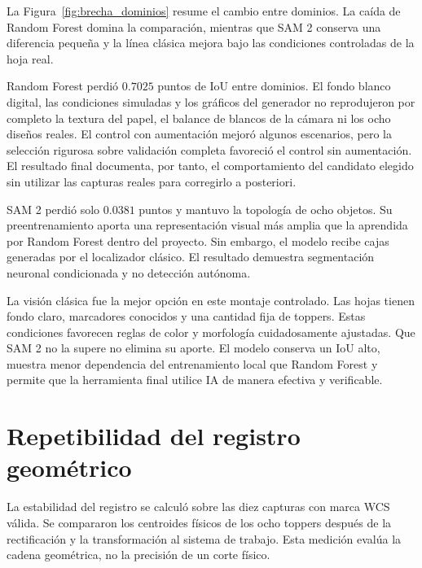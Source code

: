 La Figura~\ref{fig:brecha_dominios} resume el cambio entre dominios. La caída de Random Forest domina la comparación, mientras que SAM 2 conserva una diferencia pequeña y la línea clásica mejora bajo las condiciones controladas de la hoja real.


Random Forest perdió $0.7025$ puntos de IoU entre dominios. El fondo blanco digital, las condiciones simuladas y los gráficos del generador no reprodujeron por completo la textura del papel, el balance de blancos de la cámara ni los ocho diseños reales. El control con aumentación mejoró algunos escenarios, pero la selección rigurosa sobre validación completa favoreció el control sin aumentación. El resultado final documenta, por tanto, el comportamiento del candidato elegido sin utilizar las capturas reales para corregirlo a posteriori.

SAM 2 perdió solo $0.0381$ puntos y mantuvo la topología de ocho objetos. Su preentrenamiento aporta una representación visual más amplia que la aprendida por Random Forest dentro del proyecto. Sin embargo, el modelo recibe cajas generadas por el localizador clásico. El resultado demuestra segmentación neuronal condicionada y no detección autónoma.

La visión clásica fue la mejor opción en este montaje controlado. Las hojas tienen fondo claro, marcadores conocidos y una cantidad fija de toppers. Estas condiciones favorecen reglas de color y morfología cuidadosamente ajustadas. Que SAM 2 no la supere no elimina su aporte. El modelo conserva un IoU alto, muestra menor dependencia del entrenamiento local que Random Forest y permite que la herramienta final utilice IA de manera efectiva y verificable.

\section{Repetibilidad del registro geométrico}

La estabilidad del registro se calculó sobre las diez capturas con marca WCS válida. Se compararon los centroides físicos de los ocho toppers después de la rectificación y la transformación al sistema de trabajo. Esta medición evalúa la cadena geométrica, no la precisión de un corte físico.

